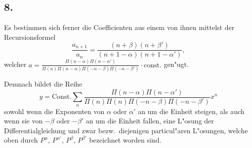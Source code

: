 \documentclass[12pt,a4paper]{book}
\theoremstyle{definition}
\theoremstyle{remark}
\begin{document}
\subsection*{8.}

Es bestimmen sich ferner die Coefficienten aus einem von ihnen mittelst der Recursionsformel
\[
\frac{a_{n+1}}{a_n} = \frac{(n + \beta)(n + \beta')}{(n + 1 - \alpha)(n + 1 - \alpha')},
\]
welcher $a = \frac{\Pi(n - \alpha) \Pi(n - \alpha')}{\Pi(n) \Pi(n - \alpha) \Pi(-n - \beta) \Pi(-n - \beta')} \cdot \text{const.}$ gen{"u}gt.

Demnach bildet die Reihe
\[
y = \text{Const.} \sum_n \frac{\Pi(n - \alpha) \Pi(n - \alpha')}{\Pi(n) \Pi(n) \Pi(-n - \beta) \Pi(-n - \beta')} x^n
\]
sowohl wenn die Exponenten von $\alpha$ oder $\alpha'$ an um die Einheit steigen, als auch wenn sie von $-\beta$ oder $-\beta'$ an um die Einheit fallen, eine L{"o}sung der Differentialgleichung und zwar bezw.\ diejenigen particul{"a}ren L{"o}sungen, welche oben durch $P^{\alpha}$, $P^{\alpha'}$, $P^{\beta}$, $P^{\beta'}$ bezeichnet worden sind.
\end{document}
